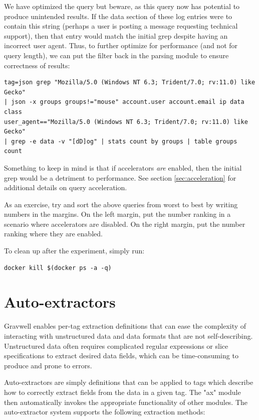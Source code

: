 We have optimized the query but beware, as this query now has
potential to produce unintended results. If the data section of these
log entries were to contain this  string (perhaps a user is
posting a message requesting technical support), then that entry would
match the initial grep despite having an incorrect user agent. Thus, to
further optimize for performance (and not for query length), we can put
the filter back in the parsing module to ensure correctness of results:

\begin{Verbatim}[breaklines=true]
tag=json grep "Mozilla/5.0 (Windows NT 6.3; Trident/7.0; rv:11.0) like Gecko" 
| json -x groups groups!="mouse" account.user account.email ip data class 
user_agent=="Mozilla/5.0 (Windows NT 6.3; Trident/7.0; rv:11.0) like Gecko"
| grep -e data -v "[dD]og" | stats count by groups | table groups count
\end{Verbatim}

Something to keep in mind is that if accelerators \emph{are} enabled, then the
initial grep would be a detriment to performance. See section \ref{sec:acceleration} for additional
details on query acceleration.

As an exercise, try and sort the above queries from worst to best by
writing numbers in the margins. On the left margin, put the number
ranking in a scenario where accelerators are disabled. On the right
margin, put the number ranking where they are enabled.

To clean up after the experiment, simply run:

\begin{Verbatim}[breaklines=true]
docker kill $(docker ps -a -q)
\end{Verbatim}


\clearpage
\section{Auto-extractors}
Gravwell enables per-tag extraction definitions that can ease the
complexity of interacting with unstructured data and data formats that
are not self-describing. Unstructured data often requires complicated
regular expressions or slice specifications to extract desired data
fields, which can be time-consuming to produce and prone to errors.

Auto-extractors are simply definitions that can be applied to tags which
describe how to correctly extract fields from the data in a given tag.
The "ax" module then automatically invokes the appropriate functionality
of other modules. The auto-extractor system supports the following
extraction methods:

